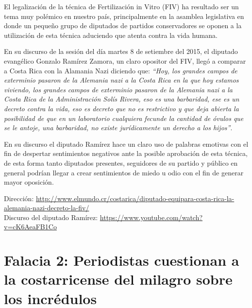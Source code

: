 \documentclass[times]{simauth}
\begin{document}
El legalización de la técnica de Fertilización in Vitro (FIV) ha resultado ser un tema muy polémico en nuestro país, principalmente en la asamblea legislativa en donde un pequeño grupo de diputados de partidos conservadores se oponen a la utilización de esta técnica aduciendo que atenta contra la vida humana.

En su discurso de la sesión del día martes 8 de setiembre del 2015, el diputado evangélico Gonzalo Ramírez Zamora, un claro opositor del FIV, llegó a comparar a Costa Rica con la Alamania Nazi diciendo que: \textit{``Hoy, los grandes campos de exterminio pasaron de la Alemania nazi a la Costa Rica en la que hoy estamos viviendo, los grandes campos de exterminio pasaron de la Alemania nazi a la Costa Rica de la Administración Solís Rivera, eso es una barbaridad, ese es un decreto contra la vida, eso es decreto que no es restrictivo y que deja abierta la posibilidad de que en un laboratorio cualquiera fecunde la cantidad de óvulos que se le antoje, una barbaridad, no existe jurídicamente un derecho a los hijos''}.

En su discurso el diputado Ramírez hace un claro uso de palabras emotivas con el fin de despertar sentimientos negativos ante la posible aprobación de esta técnica, de esta forma tanto diputados presentes, seguidores de su partido y público en general podrían llegar a crear sentimientos de miedo u odio con el fin de generar mayor oposición.

\noindent Dirección: \href{http://www.elmundo.cr/costarica/diputado-equipara-costa-rica-la-alemania-nazi-decreto-la-fiv/}{http://www.elmundo.cr/costarica/diputado-equipara-costa-rica-la-alemania-nazi-decreto-la-fiv/} \\
Discurso del diputado Ramírez: \href{https://www.youtube.com/watch?v=cK6AeaFB1Co}{https://www.youtube.com/watch?v=cK6AeaFB1Co}\\


\newpage
\section{Falacia 2: Periodistas cuestionan a la costarricense del milagro sobre los incrédulos}
\end{document}
